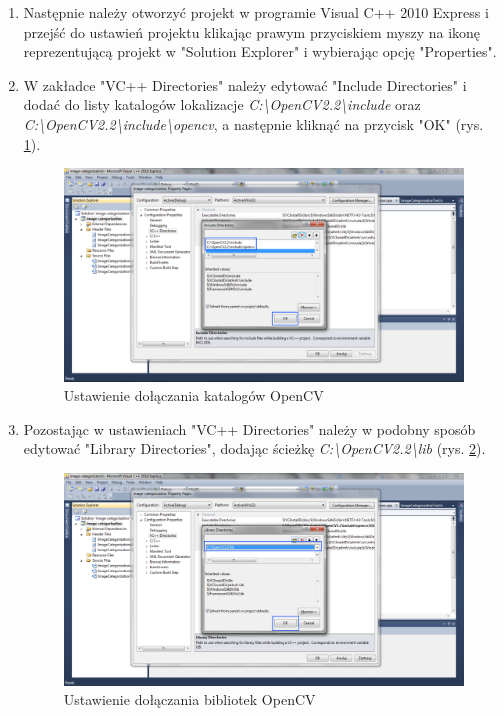 \begin{enumerate}
  \item Następnie należy otworzyć projekt w programie Visual C++ 2010 Express i przejść do ustawień projektu klikając prawym przyciskiem myszy na ikonę reprezentującą projekt w "Solution Explorer" i wybierając opcję "Properties".
  \item W zakładce "VC++ Directories" należy edytować "Include Directories" i dodać do listy katalogów lokalizacje \emph{C:\textbackslash OpenCV2.2\textbackslash include} oraz \emph{C:\textbackslash OpenCV2.2\textbackslash include\textbackslash opencv}, a następnie kliknąć na przycisk "OK" (rys. \ref{fig:ustawienia-include-dirs}).
  
	\begin{figure}[h]
		\centering
		\includegraphics[scale=0.4]{graphics/03_implementacja/ustawienia-include-dirs.pdf}
		\caption{ Ustawienie dołączania katalogów OpenCV }
		\label{fig:ustawienia-include-dirs}
	\end{figure}
	
	\item Pozostając w ustawieniach "VC++ Directories" należy w podobny sposób edytować "Library Directories", dodając ścieżkę \emph{C:\textbackslash OpenCV2.2\textbackslash lib} (rys. \ref{fig:ustawienia-lib-dirs}).
	
	\begin{figure}[h]
		\centering
		\includegraphics[scale=0.4]{graphics/03_implementacja/ustawienia-lib-dirs.pdf}
		\caption{ Ustawienie dołączania bibliotek OpenCV }
		\label{fig:ustawienia-lib-dirs}
	\end{figure}
	

\end{enumerate}
